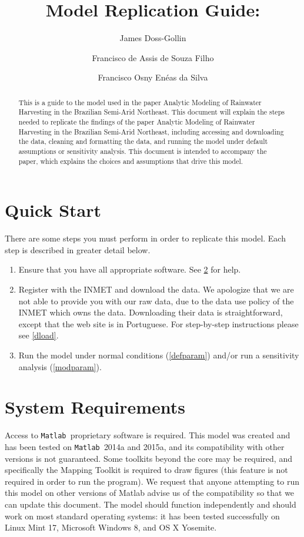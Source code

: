 \documentclass[11pt]{article} %
\title{Model Replication Guide: \\ \thepaper}
\author{James Doss-Gollin \and Francisco de Assis de Souza Filho \and Francisco Osny En\'{e}as da Silva}
\newcommand{\mtlb}{\texttt{Matlab\ }}
\newcommand{\thepaper}{Analytic Modeling of Rainwater Harvesting in the Brazilian Semi-Arid Northeast}
\begin{document}
\maketitle %

\begin{abstract} %
This is a guide to the model used in the paper \thepaper.
This document will explain the steps needed to replicate the findings of the paper \thepaper, including accessing and downloading the data, cleaning and formatting the data, and running the model under default assumptions or sensitivity analysis.
This document is intended to accompany the paper, which explains the choices and assumptions that drive this model.
\end{abstract}


\clearpage
\tableofcontents
\clearpage %


\section{Quick Start}

There are some steps you must perform in order to replicate this model.
Each step is described in greater detail below.
\begin{enumerate}
\item Ensure that you have all appropriate software. See \cref{requirements} for help.
\item Register with the \ac{INMET} and download the data. We apologize that we are not able to provide you with our raw data, due to the data use policy of the \ac{INMET} which owns the data. Downloading their data is straightforward, except that the web site is in Portuguese. For step-by-step instructions please see \cref{dload}.
\item Run the model under normal conditions (\cref{defparam}) and/or run a sensitivity analysis (\cref{modparam}).
\end{enumerate}



\section{System Requirements} \label{requirements}

Access to \mtlb proprietary software is required.
This model was created and has been tested on \mtlb 2014a and 2015a, and its compatibility with other versions is not guaranteed.
Some toolkits beyond the core may be required, and specifically the Mapping Toolkit is required to draw figures (this feature is not required in order to run the program).
We request that anyone attempting to run this model on other versions of Matlab advise us of the compatibility so that we can update this document.
The model should function independently and should work on most standard operating systems: it has been tested successfully on Linux Mint 17, Microsoft Windows 8, and OS X Yosemite.
\end{document}
